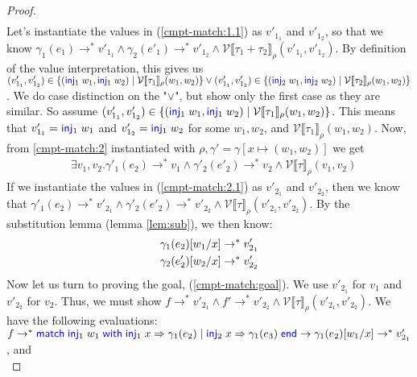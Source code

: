 \documentclass[twoside,11pt,openright]{report}
\theoremstyle{definition}
\newcommand{\Keyword}[1]{{\color{blue} \mathsf{#1}}}
\newcommand{\var}{x}
\newcommand{\expr}{e}
\newcommand{\val}{v}
\newcommand{\valB}{w}
\newcommand{\Inj}[1]{\Keyword{inj}_{#1}\;}
\newcommand{\MatchCmd}{\Keyword{match}}
\newcommand{\WithCmd}{\Keyword{with}}
\newcommand{\EndCmd}{\Keyword{end}}
\def\Match#1with#2=>#3|#4=>#5end{\MatchCmd{}\;#1\;\WithCmd{}\;#2\Rightarrow#3 \;|\;#4\Rightarrow#5\;\EndCmd{}}
\newcommand{\subst}[3]{#1{\left[#3 \middle/ #2 \right]}}
\newcommand{\Tsum}[2]{#1 + #2}
\newcommand{\typ}{\tau}
\newcommand{\step}{\rightarrow}
\newcommand{\stepS}{\rightarrow^*}
\newcommand{\ValInp}[2]{\mathcal{V} \llbracket #1 \rrbracket_{#2}}
\newcommand{\map}[2]{#1 \mapsto #2}
\begin{document}
\begin{proof}
\begin{align}
  \end{align}
  Let's instantiate the values in (\ref*{cmpt-match:1.1}) as $\val'_{1_1}$ and $\val'_{1_2}$, so that we know $\gamma_1(\expr_1) \stepS \val'_{1_1} \land \gamma_2(\expr'_1) \stepS \val'_{1_2} \land \ValInp{\Tsum{\typ_1}{\typ_2}}{\rho}(\val'_{1_1}, \val'_{1_2})$. By definition of the value interpretation, this gives us\\
  $(\val'_{1_1}, \val'_{1_2}) \in \{(\Inj{1} \valB_1, \Inj{1} \valB_2) \mid \ValInp{\typ_1}{\rho}(\valB_1, \valB_2)\} \lor
  (\val'_{1_1}, \val'_{1_2}) \in \{(\Inj{2} \valB_1, \Inj{2} \valB_2) \mid \ValInp{\typ_2}{\rho}(\valB_1, \valB_2)\}$. We do case distinction on the "$\lor$", but show only the first case as they are similar. So assume 
  $(\val'_{1_1}, \val'_{1_2}) \in \{(\Inj{1} \valB_1, \Inj{1} \valB_2) \mid \ValInp{\typ_1}{\rho}(\valB_1, \valB_2)\}$. This means that $\val'_{1_1} = \Inj{1} \valB_1$ and $\val'_{1_2} = \Inj{1} \valB_2$ for some $\valB_1, \valB_2$, and $\ValInp{\typ_1}{\rho}(\valB_1, \valB_2)$.
  Now, from \ref{cmpt-match:2} instantiated with $\rho, \gamma' = \gamma[\map{\var}{(\valB_1, \valB_2)}]$ we get
  \begin{align}
    &\exists \val_1, \val_2 . \gamma'_1(\expr_2) \stepS \val_1 \land \gamma'_2(\expr'_2) \stepS \val_2 \land \ValInp{\typ}{\rho}(\val_1, \val_2)\label{cmpt-match:2.1}
  \end{align}
  If we instantiate the values in (\ref*{cmpt-match:2.1}) as $\val'_{2_1}$ and $\val'_{2_2}$, then we know that $\gamma'_1(\expr_2) \stepS \val'_{2_1} \land \gamma'_2(\expr'_2) \stepS \val'_{2_2} \land \ValInp{\typ}{\rho}(\val'_{2_1}, \val'_{2_2})$. By the substitution lemma (lemma \ref{lem:sub}), we then know:
  \begin{align}
    &\subst{\gamma_1(\expr_2)}{\var}{\valB_1} \stepS \val'_{2_1}\label{cmpt-match:sub.1}\\
    &\subst{\gamma_2(\expr'_2)}{\var}{\valB_2} \stepS \val'_{2_2}\label{cmpt-match:sub.2}
  \end{align}
  Now let us turn to proving the goal, (\ref*{cmpt-match:goal}). We use $\val'_{2_1}$ for $\val_1$ and $\val'_{2_2}$ for $\val_2$. Thus, we must show 
  $f \stepS \val'_{2_1} \land f' \stepS \val'_{2_2} \land \ValInp{\typ}{\rho}(\val'_{2_1}, \val'_{2_2})$. We have the following evaluations:\\
  $f \stepS \Match \Inj{1} \valB_1 with \Inj{1} \var => \gamma_1(\expr_2) | \Inj{2} \var => \gamma_1(\expr_3) end \step \subst{\gamma_1(\expr_2)}{\var}{\valB_1} \stepS \val'_{2_1}$, and\\

\end{proof}
\end{document}
